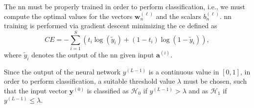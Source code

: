 \documentclass[conference]{IEEEtran}
\begin{document}
The \ac{nn} must be properly trained in order to perform classification, i.e., we must compute the optimal values for the vectors $\bm{w}_n^{(\ell)}$ and the scalars $b_n^{(\ell)}$. \ac{nn} training is performed via gradient descent minimizing the \ac{ce} defined as
\begin{equation}\label{eq:ce}
CE = -\sum_{i=1}^{S}\left(t_i\log\left(\tilde{y}_i\right)+\left(1-t_i\right)\log\left(1-\tilde{y}_i\right) \right),
\end{equation}
where $\tilde{y}_i$ denotes the output of the \ac{nn} given input $\bm{a}^{(i)}$.

Since the output of the neural network $y^{(L-1)}$ is a continuous value in $[0,1]$, in order to perform classification, a suitable threshold value $\lambda$ must be chosen, such that the input vector $\bm{y}^{(0)}$ is classified as
$\mathcal{H}_0$ if $y^{(L-1)} > \lambda$ and as $\mathcal{H}_1$ if $y^{(L-1)} \le \lambda$.

\end{document}
